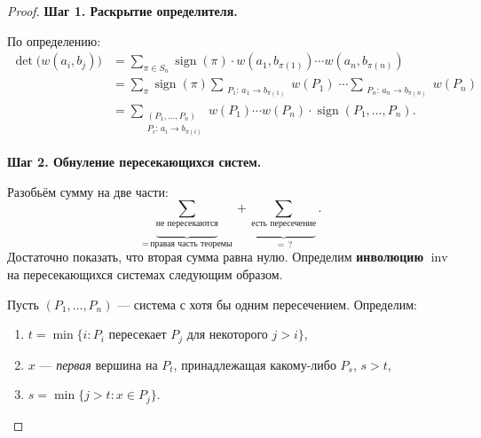 \begin{proof}
	\textbf{Шаг 1. Раскрытие определителя.}
	
	По определению:
	\begin{align*}
		\det\!\bigl(w(a_i,b_j)\bigr)
		&= \sum_{\pi\in S_n} \operatorname{sign}(\pi)\cdot
		w(a_1, b_{\pi(1)}) \cdots w(a_n, b_{\pi(n)}) \\
		&= \sum_{\pi} \operatorname{sign}(\pi)
		\!\!\!\!\sum_{\substack{P_1:\,a_1 \to b_{\pi(1)}}}\!\!\! w(P_1)
		\;\cdots\!\!\!\!
		\sum_{\substack{P_n:\,a_n \to b_{\pi(n)}}}\!\!\! w(P_n) \\
		&= \sum_{\substack{(P_1,\ldots,P_n) \\ P_i:\,a_i \to b_{\pi(i)}}}
		w(P_1)\cdots w(P_n)\cdot\operatorname{sign}(P_1,\ldots,P_n).
	\end{align*}
	
	\textbf{Шаг 2. Обнуление пересекающихся систем.}
	
	Разобьём сумму на две части:
	\[
	\underbrace{\sum_{\text{не пересекаются}}}_{=\,\text{правая часть теоремы}}
	+
	\underbrace{\sum_{\text{есть пересечение}}}_{=\,?}.
	\]
	Достаточно показать, что вторая сумма равна нулю. Определим \textbf{инволюцию}
	$\operatorname{inv}$ на пересекающихся системах следующим образом.
	
	Пусть $(P_1,\ldots,P_n)$ — система с хотя бы одним пересечением. Определим:
	\begin{enumerate}
		\item $t = \min\{i : P_i \text{ пересекает } P_j \text{ для некоторого } j>i\}$,
		\item $x$ — \emph{первая} вершина на $P_t$, принадлежащая какому-либо $P_s$, $s > t$,
		\item $s = \min\{j > t : x \in P_j\}$.
	\end{enumerate}
	
	\begin{center}
	\end{center}
	

\end{proof}
